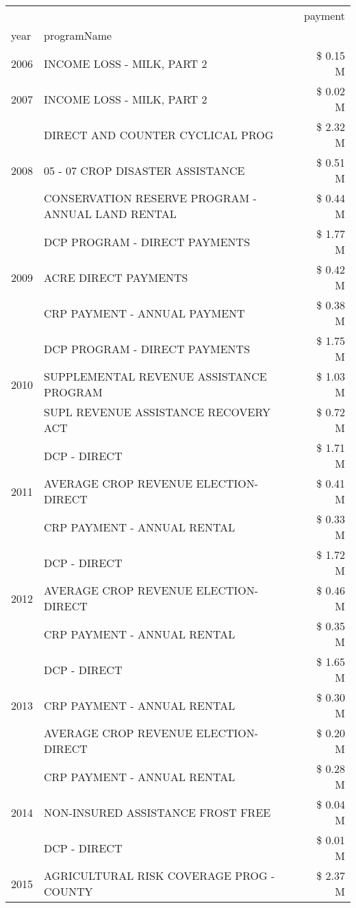 \begin{tabular}{llr}
\toprule
 &  & payment \\
year & programName &  \\
\midrule
2006 & INCOME LOSS - MILK, PART 2 & \$ 0.15 M \\
\cline{1-3}
2007 & INCOME LOSS - MILK, PART 2 & \$ 0.02 M \\
\cline{1-3}
\multirow[t]{3}{*}{2008} & DIRECT AND COUNTER CYCLICAL PROG & \$ 2.32 M \\
 & 05 - 07 CROP DISASTER ASSISTANCE & \$ 0.51 M \\
 & CONSERVATION RESERVE PROGRAM - ANNUAL LAND RENTAL & \$ 0.44 M \\
\cline{1-3}
\multirow[t]{3}{*}{2009} & DCP PROGRAM - DIRECT PAYMENTS & \$ 1.77 M \\
 & ACRE DIRECT PAYMENTS & \$ 0.42 M \\
 & CRP PAYMENT - ANNUAL PAYMENT & \$ 0.38 M \\
\cline{1-3}
\multirow[t]{3}{*}{2010} & DCP PROGRAM - DIRECT PAYMENTS & \$ 1.75 M \\
 & SUPPLEMENTAL REVENUE ASSISTANCE PROGRAM & \$ 1.03 M \\
 & SUPL REVENUE ASSISTANCE RECOVERY ACT & \$ 0.72 M \\
\cline{1-3}
\multirow[t]{3}{*}{2011} & DCP - DIRECT & \$ 1.71 M \\
 & AVERAGE CROP REVENUE ELECTION-DIRECT & \$ 0.41 M \\
 & CRP PAYMENT - ANNUAL RENTAL & \$ 0.33 M \\
\cline{1-3}
\multirow[t]{3}{*}{2012} & DCP - DIRECT & \$ 1.72 M \\
 & AVERAGE CROP REVENUE ELECTION-DIRECT & \$ 0.46 M \\
 & CRP PAYMENT - ANNUAL RENTAL & \$ 0.35 M \\
\cline{1-3}
\multirow[t]{3}{*}{2013} & DCP - DIRECT & \$ 1.65 M \\
 & CRP PAYMENT - ANNUAL RENTAL & \$ 0.30 M \\
 & AVERAGE CROP REVENUE ELECTION-DIRECT & \$ 0.20 M \\
\cline{1-3}
\multirow[t]{3}{*}{2014} & CRP PAYMENT - ANNUAL RENTAL & \$ 0.28 M \\
 & NON-INSURED ASSISTANCE FROST FREE & \$ 0.04 M \\
 & DCP - DIRECT & \$ 0.01 M \\
\cline{1-3}
\multirow[t]{3}{*}{2015} & AGRICULTURAL RISK COVERAGE PROG - COUNTY & \$ 2.37 M \\

\end{tabular}
